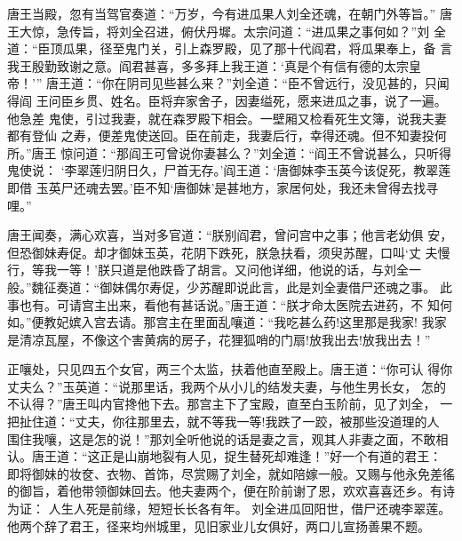 唐王当殿，忽有当驾官奏道：“万岁，今有进瓜果人刘全还魂，在朝门外等旨。”
唐王大惊，急传旨，将刘全召进，俯伏丹墀。太宗问道：“进瓜果之事何如？”刘
全道：“臣顶瓜果，径至鬼门关，引上森罗殿，见了那十代阎君，将瓜果奉上，备
言我王殷勤致谢之意。阎君甚喜，多多拜上我王道：‘真是个有信有德的太宗皇帝！’”
唐王道：“你在阴司见些甚么来？”刘全道：“臣不曾远行，没见甚的，只闻得阎
王问臣乡贯、姓名。臣将弃家舍子，因妻缢死，愿来进瓜之事，说了一遍。他急差
鬼使，引过我妻，就在森罗殿下相会。一壁厢又检看死生文簿，说我夫妻都有登仙
之寿，便差鬼使送回。臣在前走，我妻后行，幸得还魂。但不知妻投何所。”唐王
惊问道：“那阎王可曾说你妻甚么？”刘全道：“阎王不曾说甚么，只听得鬼使说：
‘李翠莲归阴日久，尸首无存。’阎王道：‘唐御妹李玉英今该促死，教翠莲即借
玉英尸还魂去罢。’臣不知‘唐御妹’是甚地方，家居何处，我还未曾得去找寻哩。”

唐王闻奏，满心欢喜，当对多官道：“朕别阎君，曾问宫中之事；他言老幼俱
安，但恐御妹寿促。却才御妹玉英，花阴下跌死，朕急扶看，须臾苏醒，口叫‘丈
夫慢行，等我一等！’朕只道是他跌昏了胡言。又问他详细，他说的话，与刘全一
般。”魏征奏道：“御妹偶尔寿促，少苏醒即说此言，此是刘全妻借尸还魂之事。
此事也有。可请宫主出来，看他有甚话说。”唐王道：“朕才命太医院去进药，不
知何如。”便教妃嫔入宫去请。那宫主在里面乱嚷道：“我吃甚么药!这里那是我家!
我家是清凉瓦屋，不像这个害黄病的房子，花狸狐哨的门扇!放我出去!放我出去！”

正嚷处，只见四五个女官，两三个太监，扶着他直至殿上。唐王道：“你可认
得你丈夫么？”玉英道：“说那里话，我两个从小儿的结发夫妻，与他生男长女，
怎的不认得？”唐王叫内官搀他下去。那宫主下了宝殿，直至白玉阶前，见了刘全，
一把扯住道：“丈夫，你往那里去，就不等我一等!我跌了一跤，被那些没道理的人
围住我嚷，这是怎的说！”那刘全听他说的话是妻之言，观其人非妻之面，不敢相
认。唐王道：“这正是山崩地裂有人见，捉生替死却难逢！”好一个有道的君王：
即将御妹的妆奁、衣物、首饰，尽赏赐了刘全，就如陪嫁一般。又赐与他永免差徭
的御旨，着他带领御妹回去。他夫妻两个，便在阶前谢了恩，欢欢喜喜还乡。有诗
为证：
人生人死是前缘，短短长长各有年。
刘全进瓜回阳世，借尸还魂李翠莲。
他两个辞了君王，径来均州城里，见旧家业儿女俱好，两口儿宣扬善果不题。

